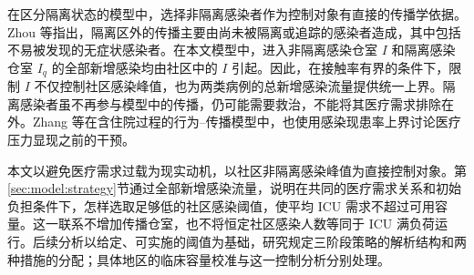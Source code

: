 在区分隔离状态的模型中，选择非隔离感染者作为控制对象有直接的传播学依据。Zhou 等\cite{Zhou2024SPCI}指出，隔离区外的传播主要由尚未被隔离或追踪的感染者造成，其中包括不易被发现的无症状感染者。在本文模型中，进入非隔离感染仓室 $I$ 和隔离感染仓室 $I_q$ 的全部新增感染均由社区中的 $I$ 引起。因此，在接触率有界的条件下，限制 $I$ 不仅控制社区感染峰值，也为两类病例的总新增感染流量提供统一上界。隔离感染者虽不再参与模型中的传播，仍可能需要救治，不能将其医疗需求排除在外。Zhang 等\cite{Zhang2026Behavior}在含住院过程的行为--传播模型中，也使用感染现患率上界讨论医疗压力显现之前的干预。

本文以避免医疗需求过载为现实动机，以社区非隔离感染峰值为直接控制对象。第\ref{sec:model:strategy}节通过全部新增感染流量，说明在共同的医疗需求关系和初始负担条件下，怎样选取足够低的社区感染阈值，使平均 ICU 需求不超过可用容量。这一联系不增加传播仓室，也不将恒定社区感染人数等同于 ICU 满负荷运行。后续分析以给定、可实施的阈值为基础，研究规定三阶段策略的解析结构和两种措施的分配；具体地区的临床容量校准与这一控制分析分别处理。
